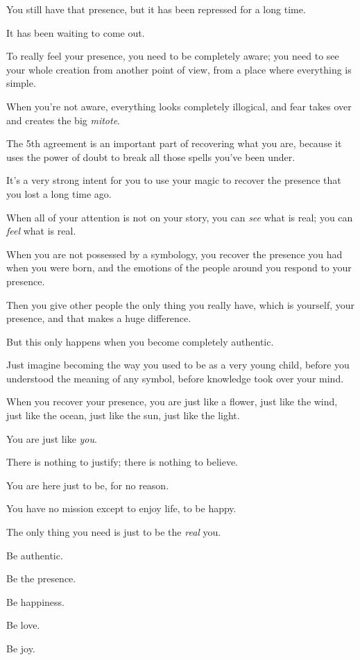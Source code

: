 \documentclass{article}
\numberwithin{equation}{section}
\begin{document}
You still have that presence, but it has been repressed for a long time.

It has been waiting to come out.

To really feel your presence, you need to be completely aware; you need to see your whole creation from another point of view, from a place where everything is simple.

When you're not aware, everything looks completely illogical, and fear takes over and creates the big \textit{mitote}.

%
The 5th agreement is an important part of recovering what you are, because it uses the power of doubt to break all those spells you've been under.

It's a very strong intent for you to use your magic to recover the presence that you lost a long time ago.

When all of your attention is not on your story, you can \textit{see} what is real; you can \textit{feel} what is real.

When you are not possessed by a symbology, you recover the presence you had when you were born, and the emotions of the people around you respond to your presence.

Then you give other people the only thing you really have, which is yourself, your presence, and that makes a huge difference.

But this only happens when you become completely authentic.

%
Just imagine becoming the way you used to be as a very young child, before you understood the meaning of any symbol, before knowledge took over your mind.

When you recover your presence, you are just like a flower, just like the wind, just like the ocean, just like the sun, just like the light.

You are just like \textit{you}.

There is nothing to justify; there is nothing to believe.

You are here just to be, for no reason.

You have no mission except to enjoy life, to be happy.

The only thing you need is just to be the \textit{real} you.

Be authentic.

Be the presence.

Be happiness.

Be love.

Be joy.
\end{document}
